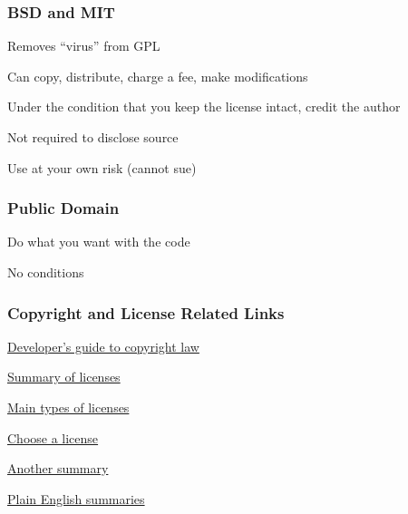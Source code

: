 \documentclass[t,12pt,numbers,fleqn]{beamer}
\begin{document}

\begin{frame}
\frametitle{BSD and MIT}

\bi
\item Removes ``virus'' from GPL
\item Can copy, distribute, charge a fee, make modifications
\item Under the condition that you keep the license intact, credit the author
\item Not required to disclose source 
\item Use at your own risk (cannot sue)
\ei

\end{frame}


\begin{frame}
\frametitle{Public Domain}

\bi
\item Do what you want with the code
\item No conditions
\ei

\end{frame}


\begin{frame}
\frametitle{Copyright and License Related Links}

\bi
\item
  \href{http://haacked.com/archive/2006/01/24/TheDevelopersGuideToCopyrightLaw-Part1.aspx/}{Developer's
    guide to copyright law}

\item \href{https://www.smashingmagazine.com/2010/03/a-short-guide-to-open-source-and-similar-licenses/}{Summary of licenses}

\item
  \href{http://haacked.com/archive/2007/04/04/there-are-only-four-software-licenses.aspx/}{Main
    types of licenses}

\item \href{http://choosealicense.com}{Choose a license}
\item \href{http://choosealicense.com/licenses/}{Another summary}
\item \href{https://tldrlegal.com}{Plain English summaries}

\ei

\end{frame}
\end{document}
